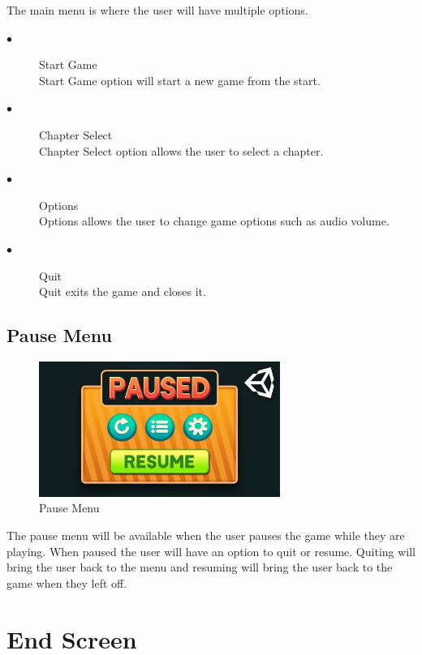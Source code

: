 \documentclass[a4paper]{scrreprt}
\begin{document}
        The main menu is where the user will have multiple options.

        \begin{description}
            \item[$\bullet$] Start Game \\
            Start Game option will start a new game from the start.
            \item[$\bullet$] Chapter Select \\
            Chapter Select option allows the user to select a chapter.
            \item[$\bullet$] Options \\
            Options allows the user to change game options such as audio volume.
            \item[$\bullet$] Quit \\
            Quit exits the game and closes it.
        \end{description}

        \subsection{Pause Menu}

        \begin{figure}[H]
            \centering
            \includegraphics[width=0.70\textwidth]{pause}
            \caption{\label{fig:art} Pause Menu}
        \end{figure}

        The pause menu will be available when the user pauses the game while they are playing. When paused the user will have an option to quit or resume.
        Quiting will bring the user back to the menu and resuming will bring the user back to the game when they left off.
    
    \section{End Screen}
\end{document}
